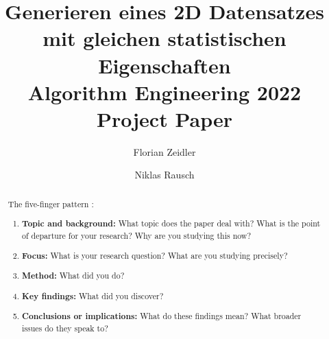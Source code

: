 \documentclass[sigconf]{acmart}
\begin{document}
\title[Generieren eines 2D Datensatzes mit gleichen statistischen Eigenschaften]{Generieren eines 2D Datensatzes mit gleichen statistischen Eigenschaften\\\large Algorithm Engineering 2022 Project Paper}


\author{Florian Zeidler}

\author{Niklas Rausch}

\begin{abstract}

The five-finger pattern \cite{macgilchrist2014}:
\begin{enumerate}
\item \textbf{Topic and background:} What topic does the paper deal with? What is the point of departure for your research? Why are you studying this now?
\item \textbf{Focus:} What is your research question? What are you studying precisely?
\item \textbf{Method:} What did you do?
\item \textbf{Key findings:} What did you discover?
\item \textbf{Conclusions or implications:} What do these findings mean? What broader issues do they speak to?
\end{enumerate}


\end{abstract}



\maketitle
\end{document}
